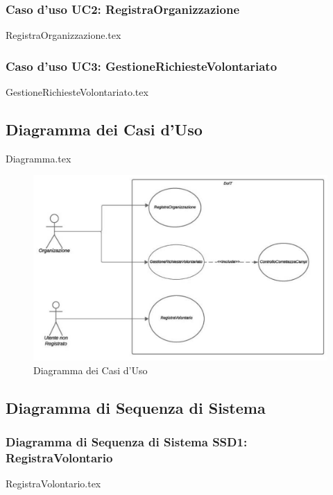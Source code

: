 \documentclass[12pt]{article}
\begin{document}
\subsubsection{Caso d'uso UC2: RegistraOrganizzazione}
{RegistraOrganizzazione.tex}

\subsubsection{Caso d'uso UC3: GestioneRichiesteVolontariato}
{GestioneRichiesteVolontariato.tex}

\subsection{Diagramma dei Casi d'Uso}
{Diagramma.tex}
\begin{figure}[H]
    \includegraphics[width=\textwidth,keepaspectratio]{Immagini/DiagrammaDeiCasiD'Uso/Iterazione 1/Diagramma.pdf}
        \caption{Diagramma dei Casi d'Uso}
        \label{fig:diagrammaCasiUso1}
\end{figure}

\subsection{Diagramma di Sequenza di Sistema}
\subsubsection{Diagramma di Sequenza di Sistema SSD1: RegistraVolontario}

{RegistraVolontario.tex}
\end{document}
